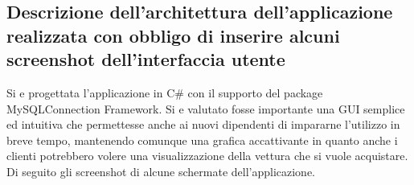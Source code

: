 \documentclass[11pt]{article}
\begin{document}
\subsection{Descrizione dell'architettura dell'applicazione realizzata con
obbligo di inserire alcuni screenshot dell'interfaccia utente}

Si e progettata l'applicazione in C\# con il supporto del package
MySQLConnection Framework. Si e valutato fosse importante una GUI semplice ed
intuitiva che permettesse anche ai nuovi dipendenti di impararne l'utilizzo in
breve tempo, mantenendo comunque una grafica accattivante in quanto anche i
clienti potrebbero volere una visualizzazione della vettura che si vuole
acquistare.\\
Di seguito gli screenshot di alcune schermate dell'applicazione.
\end{document}
